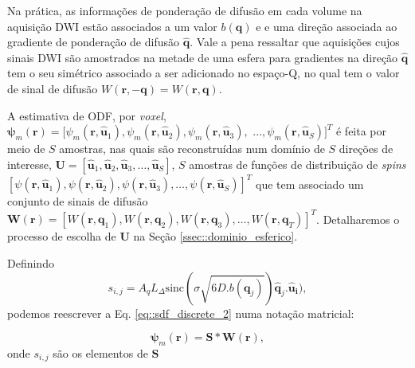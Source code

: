 \documentclass[
    12pt,                %
    oneside,            %
    a4paper,            %
    english,            %
    french,                %
    spanish,            %
    brazil                %
    ]{abntex2}
\begin{document}
 Na prática, as informações de ponderação de difusão em cada volume na aquisição DWI estão associados a um valor $b(\mathbf{q})$ e  e uma direção associada ao gradiente de ponderação de difusão $\mathbf{\hat{q}}$. Vale a pena ressaltar que aquisições cujos sinais DWI são amostrados na metade de uma esfera para gradientes na direção $\mathbf{\hat{q}}$ tem o seu simétrico associado a ser adicionado no espaço-Q, no qual tem o valor de sinal de difusão $W(\mathbf{r}, -\mathbf{q}) = W(\mathbf{r}, \mathbf{q})$.

A estimativa de ODF, por \textit{voxel}, 
$\boldsymbol{\psi}_m(\mathbf{r}) = [
\psi_m(\mathbf{r}, \mathbf{\hat{u}}_1), 
\psi_m(\mathbf{r}, \mathbf{\hat{u}}_2), 
\psi_m(\mathbf{r}, \mathbf{\hat{u}}_3),$
$ ..., 
\psi_m(\mathbf{r}, \mathbf{\hat{u}}_S)
]^T$
é feita por meio de $S$ amostras, nas quais são reconstruídas num domínio de $S$ direções de interesse, $\mathbf{U} = [
\mathbf{\hat{u}}_1, 
\mathbf{\hat{u}}_2, 
\mathbf{\hat{u}}_3, \dots, 
\mathbf{\hat{u}}_S 
]$, $S$ amostras de funções de distribuição de \textit{spins} $[
\psi(\mathbf{r}, \mathbf{\hat{u}}_1), 
\psi(\mathbf{r}, \mathbf{\hat{u}}_2), 
\psi(\mathbf{r}, \mathbf{\hat{u}}_3), \dots, 
\psi(\mathbf{r}, \mathbf{\hat{u}}_S)
]^T$ que tem associado um conjunto de sinais de difusão $\mathbf{W}(\mathbf{r}) = [
W(\mathbf{r},\mathbf{q}_1),
W(\mathbf{r},\mathbf{q}_2),
W(\mathbf{r},\mathbf{q}_3), \dots ,
W(\mathbf{r},\mathbf{q}_T)
]^T$. Detalharemos o processo de escolha de $\mathbf{U}$ na Seção \ref{ssec::dominio_esferico}.

Definindo
\begin{equation}
\label{eq::s_ij}
s_{i,j} = A_qL_{\Delta}\text{sinc}(\sigma \sqrt{6D.b(\mathbf{q}_j)} )\mathbf{\hat{q}}_j.\mathbf{\hat{u}_i}) ,
\end{equation}
podemos reescrever a Eq. \ref{eq::sdf_discrete_2} numa notação matricial:

\begin{equation}
\label{eq::gqi_vec}
    \boldsymbol{\psi}_m(\mathbf{r}) = \mathbf{S}*\mathbf{W}(\mathbf{r}) ,
\end{equation}
onde  $s_{i,j}$ são os elementos de $\mathbf{S}$

\end{document}
